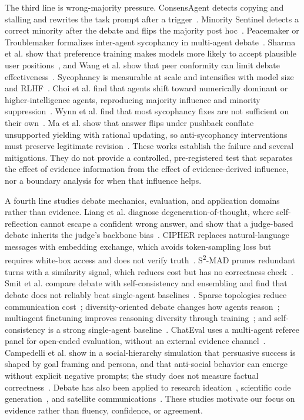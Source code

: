 \documentclass[a4paper,fleqn]{cas-sc}
\begin{document}
The third line is wrong-majority pressure. ConsensAgent detects copying and stalling and rewrites the task prompt after a trigger~\cite{pitre-etal-2025-consensagent}. Minority Sentinel detects a correct minority after the debate and flips the majority post hoc~\cite{he2026minority}. Peacemaker or Troublemaker formalizes inter-agent sycophancy in multi-agent debate~\cite{yao2025peacemaker}. Sharma et al. show that preference training makes models more likely to accept plausible user positions~\cite{sharma2024sycophancy}, and Wang et al. show that peer conformity can limit debate effectiveness~\cite{wang-etal-2024-rethinking-bounds}. Sycophancy is measurable at scale and intensifies with model size and RLHF~\cite{perez2023discovering}. Choi et al. find that agents shift toward numerically dominant or higher-intelligence agents, reproducing majority influence and minority suppression~\cite{choi2025group}. Wynn et al. find that most sycophancy fixes are not sufficient on their own~\cite{wynn2025talk}. Ma et al. show that answer flips under pushback conflate unsupported yielding with rational updating, so anti-sycophancy interventions must preserve legitimate revision~\cite{ma2026sycophancy}. These works establish the failure and several mitigations. They do not provide a controlled, pre-registered test that separates the effect of evidence information from the effect of evidence-derived influence, nor a boundary analysis for when that influence helps.

A fourth line studies debate mechanics, evaluation, and application domains rather than evidence. Liang et al. diagnose degeneration-of-thought, where self-reflection cannot escape a confident wrong answer, and show that a judge-based debate inherits the judge's backbone bias~\cite{liang2024divergent}. CIPHER replaces natural-language messages with embedding exchange, which avoids token-sampling loss but requires white-box access and does not verify truth~\cite{pham2024cipher}. S\textsuperscript{2}-MAD prunes redundant turns with a similarity signal, which reduces cost but has no correctness check~\cite{zeng2025s2mad}. Smit et al. compare debate with self-consistency and ensembling and find that debate does not reliably beat single-agent baselines~\cite{smit2024mad}. Sparse topologies reduce communication cost~\cite{li-etal-2024-improving-multi}; diversity-oriented debate changes how agents reason~\cite{liu2025breaking}; multiagent finetuning improves reasoning diversity through training~\cite{subramaniam2025multiagent}; and self-consistency is a strong single-agent baseline~\cite{wang2023selfconsistency}. ChatEval uses a multi-agent referee panel for open-ended evaluation, without an external evidence channel~\cite{chan2024chateval}. Campedelli et al. show in a social-hierarchy simulation that persuasive success is shaped by goal framing and persona, and that anti-social behavior can emerge without explicit negative prompts; the study does not measure factual correctness~\cite{campedelli2025breakfree}. Debate has also been applied to research ideation~\cite{ueda2025exploring}, scientific code generation~\cite{wang2025scalability}, and satellite communications~\cite{gomez2026multiagent}. These studies motivate our focus on evidence rather than fluency, confidence, or agreement.
\end{document}
